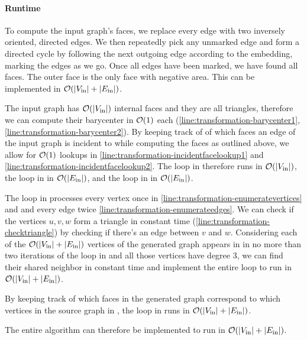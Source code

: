 \paragraph{Runtime}

To compute the input graph's faces, we replace every edge with two inversely oriented, directed edges. We then repeatedly pick any unmarked edge and form a directed cycle by following the next outgoing edge according to the embedding, marking the edges as we go. Once all edges have been marked, we have found all faces. The outer face is the only face with negative area. This can be implemented in $\mathcal{O}(\left\lvert V_\text{in}\right\rvert + \left\lvert E_\text{in}\right\rvert)$.

The input graph has $\mathcal{O}(\left\lvert V_\text{in}\right\rvert)$ internal faces and they are all triangles, therefore we can compute their barycenter in $\mathcal{O}(1)$ each (\cref{line:transformation-barycenter1}, \cref{line:transformation-barycenter2}). By keeping track of of which faces an edge of the input graph is incident to while computing the faces as outlined above, we allow for $\mathcal{O}(1)$ lookups in \cref{line:transformation-incidentfacelookup1} and \cref{line:transformation-incidentfacelookup2}. The loop in  therefore runs in $\mathcal{O}(\left\lvert V_\text{in}\right\rvert)$, the loop in  in $\mathcal{O}(\left\lvert E_\text{in}\right\rvert)$, and the loop in  in $\mathcal{O}(\left\lvert E_\text{in}\right\rvert)$.

The loop in  processes every vertex once in \cref{line:transformation-enumeratevertices} and and every edge twice \cref{line:transformation-enumerateedges}. We can check if the vertices $u,v,w$ form a triangle in constant time (\cref{line:transformation-checktriangle}) by checking if there's an edge between $v$ and $w$. Considering each of the $\mathcal{O}(\left\lvert V_\text{in}\right\rvert + \left\lvert E_\text{in}\right\rvert)$ vertices of the generated graph appears in  in no more than two iterations of the loop in  and all those vertices have degree 3, we can find their shared neighbor in constant time and implement the entire loop to run in $\mathcal{O}(\left\lvert V_\text{in}\right\rvert + \left\lvert E_\text{in}\right\rvert)$.

By keeping track of which faces in the generated graph correspond to which vertices in the source graph in , the loop in  runs in $\mathcal{O}(\left\lvert V_\text{in}\right\rvert + \left\lvert E_\text{in}\right\rvert)$.

The entire algorithm can therefore be implemented to run in $\mathcal{O}(\left\lvert V_\text{in}\right\rvert + \left\lvert E_\text{in}\right\rvert)$.
